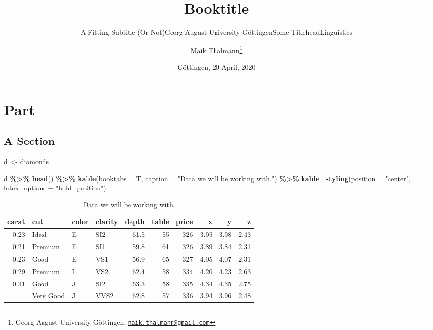 \documentclass[
    numbers=noenddot,
    open=any,
    paper=a4,
    oneside,
    pagesize,
    captions=tableabove,
    bibliography=totoc,
    11pt
    ]{scrbook}
\title{Booktitle}
\subtitle{A Fitting Subtitle (Or Not)}
\subtitle{Georg-August-University Göttingen}
\subtitle{Some Titlehead}
\subtitle{Linguistics}
\author{Maik Thalmann\footnote{Georg-August-University Göttingen,
  \href{mailto:maik.thalmann@gmail.com}{\nolinkurl{maik.thalmann@gmail.com}}}}
\date{Göttingen, 20 April, 2020}
\newenvironment{Shaded}{\begin{snugshade}}{\end{snugshade}}
\newcommand{\DataTypeTok}[1]{\textcolor[rgb]{0.13,0.29,0.53}{#1}}
\newcommand{\KeywordTok}[1]{\textcolor[rgb]{0.13,0.29,0.53}{\textbf{#1}}}
\newcommand{\NormalTok}[1]{#1}
\newcommand{\OperatorTok}[1]{\textcolor[rgb]{0.81,0.36,0.00}{\textbf{#1}}}
\newcommand{\StringTok}[1]{\textcolor[rgb]{0.31,0.60,0.02}{#1}}
\begin{document}
\maketitle

\tableofcontents
\hypertarget{part}{%
\part{Part}\label{part}}

\hypertarget{a-section}{%
\chapter{A Section}\label{a-section}}

\begin{Shaded}
\begin{Highlighting}[]
\NormalTok{d \textless{}{-}}\StringTok{ }\NormalTok{diamonds}

\NormalTok{d }\OperatorTok{\%\textgreater{}\%}
\StringTok{  }\KeywordTok{head}\NormalTok{() }\OperatorTok{\%\textgreater{}\%}
\StringTok{  }\KeywordTok{kable}\NormalTok{(}\DataTypeTok{booktabs =}\NormalTok{ T, }\DataTypeTok{caption =} \StringTok{"Data we will be working with."}\NormalTok{) }\OperatorTok{\%\textgreater{}\%}
\StringTok{  }\KeywordTok{kable\_styling}\NormalTok{(}\DataTypeTok{position =} \StringTok{"center"}\NormalTok{, }\DataTypeTok{latex\_options =} \StringTok{"hold\_position"}\NormalTok{)}
\end{Highlighting}
\end{Shaded}

\begin{table}[!h]

\caption{\label{tab:data}Data we will be working with.}
\centering
\begin{tabular}[t]{rlllrrrrrr}
\toprule
carat & cut & color & clarity & depth & table & price & x & y & z\\
\midrule
0.23 & Ideal & E & SI2 & 61.5 & 55 & 326 & 3.95 & 3.98 & 2.43\\
0.21 & Premium & E & SI1 & 59.8 & 61 & 326 & 3.89 & 3.84 & 2.31\\
0.23 & Good & E & VS1 & 56.9 & 65 & 327 & 4.05 & 4.07 & 2.31\\
0.29 & Premium & I & VS2 & 62.4 & 58 & 334 & 4.20 & 4.23 & 2.63\\
0.31 & Good & J & SI2 & 63.3 & 58 & 335 & 4.34 & 4.35 & 2.75\\
\addlinespace
0.24 & Very Good & J & VVS2 & 62.8 & 57 & 336 & 3.94 & 3.96 & 2.48\\
\bottomrule
\end{tabular}
\end{table}
\end{document}
